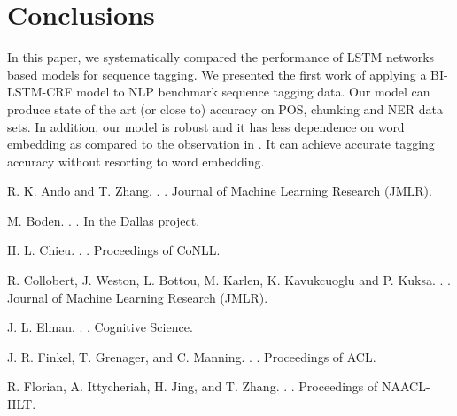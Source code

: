 \documentclass[11pt,a4paper]{article}
\begin{document}
\section{Conclusions} \label{sec:conclusion}
In this paper, we systematically compared the performance of LSTM networks based models for sequence tagging. We presented the first work of applying a BI-LSTM-CRF model to NLP benchmark sequence tagging data. Our model can produce state of the art (or close to) accuracy on POS, chunking and NER data sets. In addition, our model is robust and it has less dependence on word embedding as compared to the observation in \cite{collobert1}. It can achieve accurate tagging accuracy without resorting to word embedding. 

\begin{thebibliography}{}

R. K. Ando and T. Zhang.
.
.
\newblock Journal of Machine Learning Research (JMLR).

M. Boden.
.
.
\newblock In the Dallas project.


H. L. Chieu.
.
.
\newblock Proceedings of CoNLL.

R. Collobert, J. Weston, L. Bottou, M. Karlen, K. Kavukcuoglu and P. Kuksa.
.
.
\newblock Journal of Machine Learning Research (JMLR).

J. L. Elman.
.
.
\newblock Cognitive Science.

J. R. Finkel, T. Grenager, and C. Manning.
.
.
\newblock Proceedings of ACL.

R. Florian, A. Ittycheriah, H. Jing, and T. Zhang.
.
.
\newblock Proceedings of NAACL-HLT.


\end{thebibliography}
\end{document}

